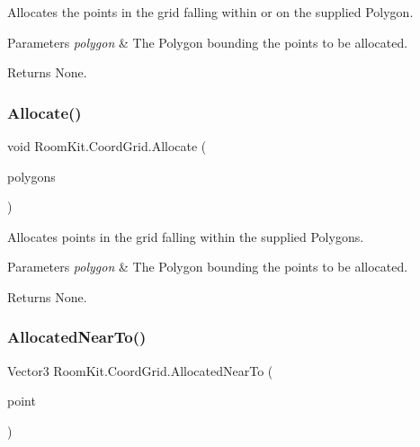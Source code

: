 Allocates the points in the grid falling within or on the supplied Polygon. 


\begin{DoxyParams}{Parameters}
{\em polygon} & The Polygon bounding the points to be allocated.\\
\hline
\end{DoxyParams}
\begin{DoxyReturn}{Returns}
None. 
\end{DoxyReturn}
\mbox{\label{class_room_kit_1_1_coord_grid_a7f96fb5788564e43b2af28ecafd36765}} 
\subsubsection{\texorpdfstring{Allocate()}{Allocate()}\hspace{0.1cm}{\footnotesize\ttfamily [2/2]}}
{\footnotesize\ttfamily void Room\+Kit.\+Coord\+Grid.\+Allocate (\begin{DoxyParamCaption}\item[{I\+List$<$ Polygon $>$}]{polygons }\end{DoxyParamCaption})}



Allocates points in the grid falling within the supplied Polygons. 


\begin{DoxyParams}{Parameters}
{\em polygon} & The Polygon bounding the points to be allocated.\\
\hline
\end{DoxyParams}
\begin{DoxyReturn}{Returns}
None. 
\end{DoxyReturn}
\mbox{\label{class_room_kit_1_1_coord_grid_ab84486d4f82f59a37698784714c0deee}} 
\subsubsection{\texorpdfstring{Allocated\+Near\+To()}{AllocatedNearTo()}}
{\footnotesize\ttfamily Vector3 Room\+Kit.\+Coord\+Grid.\+Allocated\+Near\+To (\begin{DoxyParamCaption}\item[{Vector3}]{point }\end{DoxyParamCaption})}




